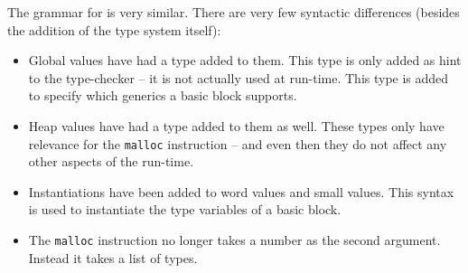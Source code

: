 The grammar for \ATAL is very similar. There are very few syntactic
differences (besides the addition of the type system itself):

\begin{itemize}
\item Global values have had a type added to them. This type is only added as
  hint to the type-checker -- it is not actually used at run-time. This type is
  added to specify which generics a basic block supports.
\item Heap values have had a type added to them as well. These types only have
  relevance for the \texttt{malloc} instruction -- and even then they do not
  affect any other aspects of the run-time.
\item Instantiations have been added to word values and small values. This
  syntax is used to instantiate the type variables of a basic block.
\item The \texttt{malloc} instruction no longer takes a number as the second
  argument. Instead it takes a list of types.
\end{itemize}

